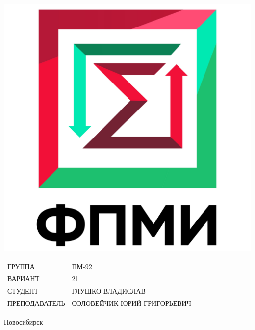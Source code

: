 \documentclass[12pt,a4paper]{article}
\begin{document}
\begin{center}
    \begin{minipage}{0.3 \textwidth}
        \includegraphics[scale=0.2]{images/fami_emblem}
    \end{minipage}%
    \hfill
    \begin{minipage}{0.7 \textwidth}
        \begin{flushleft}
            \renewcommand{\arraystretch}{2.6}
            \begin{tabular}{ll}
                \uppercase{Группа}        & ПМ-92                                  \\
                \uppercase{Вариант}       & 21                                     \\
                \uppercase{Студент}       & \uppercase{Глушко Владислав}           \\
                \uppercase{Преподаватель} & \uppercase{Соловейчик Юрий Григорьевич}\\
            \end{tabular}
            \renewcommand{\arraystretch}{1.0}
        \end{flushleft}
    \end{minipage}%

    \begin{Large}
        \vspace{32mm}

        Новосибирск\\
        \end{Large}
    \end{center}
    \newpage
\end{document}
